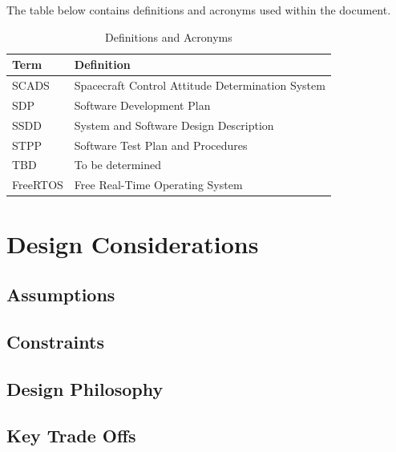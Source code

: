 \documentclass{article}
\begin{document}
        The table below contains definitions and acronyms used within the 
        document.

        \begin{table}[H]
            \caption{Definitions and Acronyms}
            \vspace{4pt}
            \centering
            \renewcommand{\arraystretch}{1.4}
            \begin{tabular}{|l|p{14cm}|}
                \hline
                \textbf{Term} & \textbf{Definition} \\ \hline
                SCADS & Spacecraft Control Attitude Determination System \\ \hline
                SDP & Software Development Plan \\ \hline
                SSDD & System and Software Design Description \\ \hline
                STPP & Software Test Plan and Procedures \\ \hline
                TBD & To be determined \\ \hline
                FreeRTOS & Free Real-Time Operating System \\ \hline
            \end{tabular}
        \end{table}

    \section{Design Considerations}\label{sec:design-considerations}

        \subsection{Assumptions}\label{ssec:assumptions}

        \subsection{Constraints}\label{ssec:constraints}

        \subsection{Design Philosophy}\label{ssec:design-philosophy}

        \subsection{Key Trade Offs}\label{ssec:key-trades}
\end{document}
